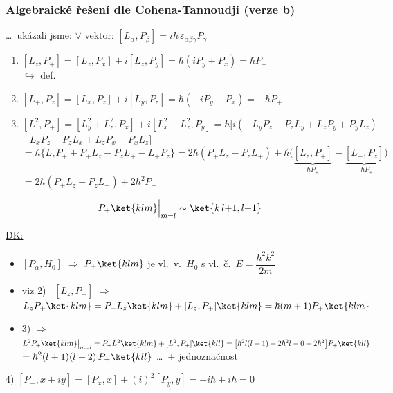 \subsubsection*{Algebraické řešení dle Cohena-Tannoudji {\normalfont\small(verze b)}}
\dots\ ukázali jsme: $\forall$ vektor: \quad $[L_\alpha,P_\beta] = i\hbar\,\varepsilon_{\alpha\beta\gamma}P_\gamma$
\begin{enumerate}[label=\arabic*)]
  \item[$\Rightarrow$ 1)] $[L_z,P_+] = [L_z,P_x] + i[L_z,P_y] = \hbar(iP_y + P_x) = \hbar P_+$ \\
        \hspace*{1.6cm} $\hookrightarrow$ def.\ 
  \item[2)] $[L_+,P_z] = [L_x,P_z] + i[L_y,P_z] = \hbar(-iP_y - P_x) = -\hbar P_+$
  \item[3)] $[L^2,P_+] = [L_y^2 + L_z^2,P_x] + i[L_x^2 + L_z^2,P_y] = \hbar\big[i(-L_yP_z - P_zL_y + L_zP_y + P_yL_z)$ \\
        \hspace*{7.4cm} $- L_xP_z - P_zL_x + L_zP_x + P_xL_z\big]$ \\
        $= \hbar\{L_zP_+ + P_+L_z - P_zL_+ - L_+P_z\} = 2\hbar(P_+L_z - P_zL_+) + \hbar\big(\underbrace{[L_z,P_+]}_{\hbar P_+} - \underbrace{[L_+,P_z]}_{-\hbar P_+}\big)$ \\
        $= 2\hbar(P_+L_z - P_zL_+) + 2\hbar^2P_+$
\end{enumerate}

\begin{veta}[Lemma]
\[ P_+\ket{klm}\Big|_{m=l} \sim \ket{k\,l{+}1,l{+}1} \]
\end{veta}
\underline{DK:}
\begin{itemize}[nosep]
  \item $[P_\alpha,H_0]$ $\Rightarrow$ $P_+\ket{klm}$ je vl.\ v.\ $H_0$ s vl.\ č.\ $E = \dfrac{\hbar^2k^2}{2m}$
  \item viz 2) \ $[L_z,P_+]$ $\Rightarrow$ $L_zP_+\ket{klm} = P_+L_z\ket{klm} + [L_z,P_+]\ket{klm} = \hbar(m+1)P_+\ket{klm}$
  \item 3) $\Rightarrow$ $L^2P_+\ket{klm}\big|_{m=l} = P_+L^2\ket{klm} + [L^2,P_+]\ket{kll} = \big[\hbar^2 l(l+1) + 2\hbar^2l - 0 + 2\hbar^2\big]P_+\ket{kll}$ \\
        \hspace*{3.4cm} $= \hbar^2(l+1)(l+2)\,P_+\ket{kll}$ \quad \dots\ + jednoznačnost
\end{itemize}
4) \quad $[P_+,x + iy] = [P_x,x] + (i)^2[P_y,y] = -i\hbar + i\hbar = 0$

